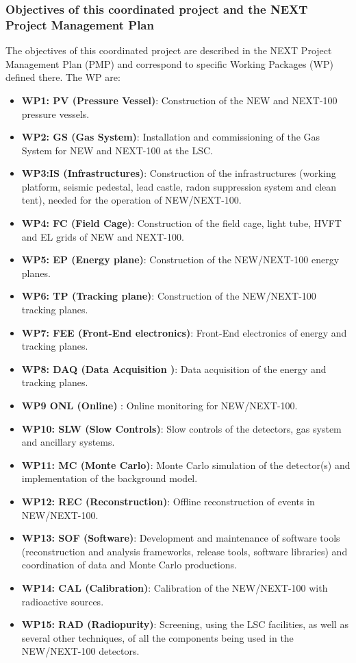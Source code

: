 \subsubsection*{Objectives of this coordinated project and the NEXT Project Management Plan}

The objectives of this coordinated project are described in the NEXT Project Management Plan (PMP) and correspond to specific Working Packages (WP) defined there. The WP are:

\begin{itemize}
\item {\bf WP1: PV (Pressure Vessel)}: Construction of the NEW and NEXT-100 pressure vessels. 
\item {\bf WP2: GS (Gas System)}: Installation and commissioning of the Gas System for NEW and NEXT-100 at the LSC. 
\item {\bf WP3:IS (Infrastructures)}: Construction of the infrastructures (working platform, seismic pedestal, lead castle, radon suppression system and clean tent), needed for the operation of NEW/NEXT-100.
\item {\bf WP4: FC (Field Cage)}: Construction of the field cage, light tube, HVFT and EL grids of NEW and NEXT-100.
\item {\bf WP5: EP (Energy plane)}: Construction of the NEW/NEXT-100 energy planes.
\item {\bf WP6: TP (Tracking plane)}: Construction of the NEW/NEXT-100 tracking planes.
\item {\bf WP7: FEE (Front-End electronics)}: Front-End electronics of energy and tracking planes.
\item {\bf WP8: DAQ (Data Acquisition )}: Data  acquisition of the energy and tracking planes.
\item {\bf WP9 ONL (Online) }: Online monitoring for NEW/NEXT-100. 
\item {\bf WP10: SLW (Slow Controls)}: Slow controls of the detectors, gas system and ancillary systems.
\item {\bf WP11: MC (Monte Carlo)}: Monte Carlo simulation of the detector(s) and implementation of the background model. 
\item {\bf WP12: REC (Reconstruction)}: Offline reconstruction of events in NEW/NEXT-100.
\item {\bf WP13: SOF (Software)}: Development and maintenance of software tools (reconstruction and analysis frameworks, release tools, software libraries) and coordination of data and Monte Carlo productions. 
\item {\bf WP14: CAL (Calibration)}: Calibration of the NEW/NEXT-100 with radioactive sources. 
\item {\bf WP15: RAD (Radiopurity)}: Screening, using the LSC facilities, as well as several other techniques, of all the components being used in the  NEW/NEXT-100 detectors. 
\end{itemize}

